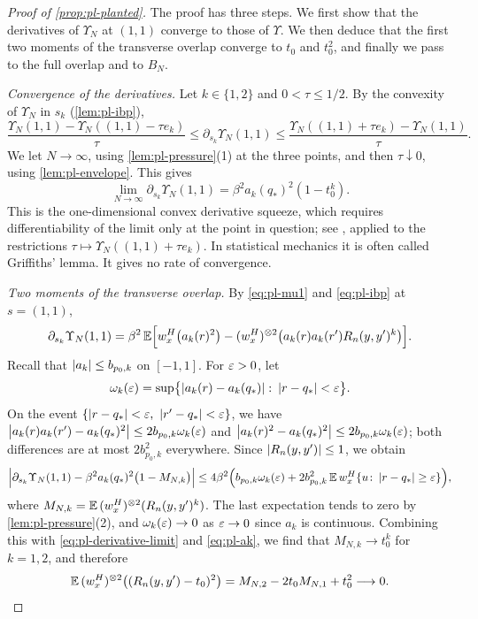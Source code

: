 \begin{proof}[Proof of \cref{prop:pl-planted}]
The proof has three steps. We first show that the derivatives of $\Upsilon_N$ at $(1,1)$ converge to those of $\Upsilon$. We then deduce that the first two moments of the transverse overlap converge to $t_0$ and $t_0^2$, and finally we pass to the full overlap and to $B_N$.

\emph{Convergence of the derivatives.} Let $k\in\{1,2\}$ and $0<\tau\le1/2$. By the convexity of $\Upsilon_N$ in $s_k$ (\cref{lem:pl-ibp}),
\[
\frac{\Upsilon_N(1,1)-\Upsilon_N((1,1)-\tau e_k)}\tau\le\partial_{s_k}\Upsilon_N(1,1)\le\frac{\Upsilon_N((1,1)+\tau e_k)-\Upsilon_N(1,1)}\tau .
\]
We let $N\to\infty$, using \cref{lem:pl-pressure}(1) at the three points, and then $\tau\downarrow0$, using \cref{lem:pl-envelope}. This gives
\begin{equation}\label{eq:pl-derivative-limit}
\lim_{N\to\infty}\partial_{s_k}\Upsilon_N(1,1)=\beta^2a_k(q_*)^2(1-t_0^k).
\end{equation}
This is the one-dimensional convex derivative squeeze, which requires differentiability of the limit only at the point in question; see \cite[Theorem~24.5]{Rockafellar1970}, applied to the restrictions $\tau\mapsto\Upsilon_N((1,1)+\tau e_k)$. In statistical mechanics it is often called Griffiths' lemma. It gives no rate of convergence.

\emph{Two moments of the transverse overlap.} By \eqref{eq:pl-mu1} and \eqref{eq:pl-ibp} at $s=(1,1)$,
\begin{equation}\label{eq:pl-ibp1}
\partial_{s_k}\Upsilon_N(1,1)=\beta^2\,\mathbb E\Bigl[w_x^H\bigl(a_k(r)^2\bigr)-(w_x^H)^{\otimes2}\bigl(a_k(r)a_k(r')R_n(y,y')^k\bigr)\Bigr].
\end{equation}
Recall that $\left|a_k\right|\le b_{p_0,k}$ on $[-1,1]$. For $\varepsilon>0$, let
\[
\omega_k(\varepsilon)=\sup\bigl\{\left|a_k(r)-a_k(q_*)\right|\colon\left|r-q_*\right|<\varepsilon\bigr\}.
\]
On the event $\{\abs{r-q_*}<\eps,\ \abs{r'-q_*}<\eps\}$, we have $\left|a_k(r)a_k(r')-a_k(q_*)^2\right|\le2b_{p_0,k}\omega_k(\varepsilon)$ and $\left|a_k(r)^2-a_k(q_*)^2\right|\le2b_{p_0,k}\omega_k(\varepsilon)$; both differences are at most $2b_{p_0,k}^2$ everywhere. Since $\left|R_n(y,y')\right|\le1$, we obtain
\[
\Bigl|\partial_{s_k}\Upsilon_N(1,1)-\beta^2a_k(q_*)^2\bigl(1-M_{N,k}\bigr)\Bigr|\le4\beta^2\Bigl(b_{p_0,k}\omega_k(\varepsilon)+2b_{p_0,k}^2\,\mathbb E\,w_x^H\{u\colon\left|r-q_*\right|\ge\varepsilon\}\Bigr),
\]
where $M_{N,k}=\mathbb E\,(w_x^H)^{\otimes2}(R_n(y,y')^k)$. The last expectation tends to zero by \cref{lem:pl-pressure}(2), and $\omega_k(\varepsilon)\to0$ as $\varepsilon\to0$ since $a_k$ is continuous. Combining this with \eqref{eq:pl-derivative-limit} and \eqref{eq:pl-ak}, we find that $M_{N,k}\to t_0^k$ for $k=1,2$, and therefore
\begin{equation}\label{eq:pl-transverse-L2}
\mathbb E\,(w_x^H)^{\otimes2}\bigl((R_n(y,y')-t_0)^2\bigr)=M_{N,2}-2t_0M_{N,1}+t_0^2\longrightarrow0 .
\end{equation}


\end{proof}
